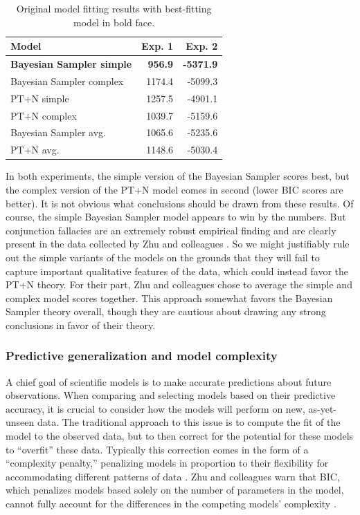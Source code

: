 \documentclass[
  english,
  man,floatsintext]{apa6}
\begin{document}
\begin{table}

\caption{\label{tab:table1}Original model fitting results with best-fitting model in bold face.}
\centering
\begin{tabular}[t]{lrr}
\toprule
Model & Exp. 1 & Exp. 2\\
\midrule
\textbf{Bayesian Sampler simple} & \textbf{956.9} & \textbf{-5371.9}\\
Bayesian Sampler complex & 1174.4 & -5099.3\\
PT+N simple & 1257.5 & -4901.1\\
PT+N complex & 1039.7 & -5159.6\\
Bayesian Sampler avg. & 1065.6 & -5235.6\\
\addlinespace
PT+N avg. & 1148.6 & -5030.4\\
\bottomrule
\end{tabular}
\end{table}

In both experiments, the simple version of the Bayesian Sampler scores best, but the complex version of the PT+N model comes in second (lower BIC scores are better). It is not obvious what conclusions should be drawn from these results. Of course, the simple Bayesian Sampler model appears to win by the numbers. But conjunction fallacies are an extremely robust empirical finding \autocite{mellers.etal2001,sides.etal2002} and are clearly present in the data collected by Zhu and colleagues \autocite*{zhu.etal2020}. So we might justifiably rule out the simple variants of the models on the grounds that they will fail to capture important qualitative features of the data, which could instead favor the PT+N theory. For their part, Zhu and colleagues \autocite*{zhu.etal2020} chose to average the simple and complex model scores together. This approach somewhat favors the Bayesian Sampler theory overall, though they are cautious about drawing any strong conclusions in favor of their theory.

\hypertarget{predictive-generalization-and-model-complexity}{%
\subsubsection{Predictive generalization and model complexity}\label{predictive-generalization-and-model-complexity}}

A chief goal of scientific models is to make accurate predictions about future observations. When comparing and selecting models based on their predictive accuracy, it is crucial to consider how the models will perform on new, as-yet-unseen data. The traditional approach to this issue is to compute the fit of the model to the observed data, but to then correct for the potential for these models to ``overfit'' these data. Typically this correction comes in the form of a ``complexity penalty,'' penalizing models in proportion to their flexibility for accommodating different patterns of data \autocite{gelman.etal2014}. Zhu and colleagues \autocite*{zhu.etal2020} warn that BIC, which penalizes models based solely on the number of parameters in the model, cannot fully account for the differences in the competing models' complexity \autocite[also see][]{piantadosi2018}.
\end{document}
